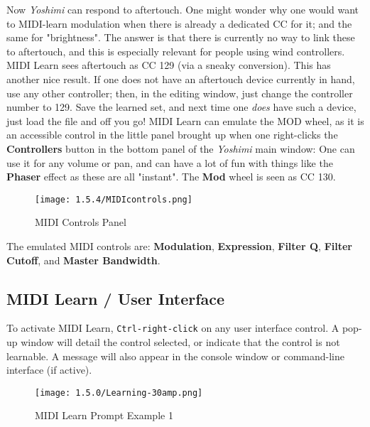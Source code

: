    Now \textsl{Yoshimi} can respond to aftertouch.
   One might wonder why one would want to MIDI-learn modulation when there is
   already a dedicated CC for it; and the same for "brightness". The answer is
   that there is currently no way to link these to aftertouch, and this is
   especially relevant for people using wind controllers.
   MIDI Learn sees aftertouch as CC 129 (via a sneaky conversion).
   This has another nice result.
   If one does not have an aftertouch device currently
   in hand, use any other controller; then, in the editing window, just change
   the controller number to 129. Save the learned set, and next time one
   \textsl{does} have such a device, just load the file and off you go!  MIDI
   Learn can emulate the MOD wheel, as it is an accessible control in the
   little panel brought up when one right-clicks the \textbf{Controllers}
   button in the bottom panel of the \textsl{Yoshimi} main window: One can use
   it for any volume or pan, and can have a lot of fun with things like the
   \textbf{Phaser} effect as these are all "instant".  The \textbf{Mod} wheel
   is seen as CC 130.

\begin{figure}[H]
   \centering
   \texttt{[image: 1.5.4/MIDIcontrols.png]}
   \caption{MIDI Controls Panel}
   \label{fig:midi_controls_panel}
\end{figure}

   The emulated  MIDI controls are:
    \textbf{Modulation},
    \textbf{Expression},
    \textbf{Filter Q},
    \textbf{Filter Cutoff}, and
    \textbf{Master Bandwidth}.

\subsection{MIDI Learn / User Interface}
\label{subsec:midi_learn_user_interface}

   To activate MIDI Learn, \texttt{Ctrl-right-click}
   on any user interface control.
   A pop-up window will detail the control selected, or indicate that the
   control is not learnable.
   A message will also appear in the console window or command-line interface
   (if active).

\begin{figure}[H]
   \centering
   \texttt{[image: 1.5.0/Learning-30amp.png]}
   \caption{MIDI Learn Prompt Example 1}
   \label{fig:midi_learn_ex_1}
\end{figure}

